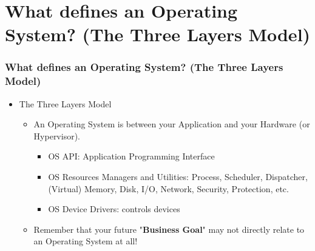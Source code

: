\documentclass[aspectratio=169, xcolor=table, notheorems, hyperref={pdfpagelabels=false}]{beamer}
\begin{document}
\section{What defines an Operating System? (The Three Layers Model)}
\begin{frame}
\frametitle{What defines an Operating System? (The Three Layers Model)}
\begin{multicols}{2}
\begin{table}
\end{table}
  \vfill \null
\columnbreak
  \begin{itemize}
    \item The Three Layers Model
  \begin{itemize}
    \item An Operating System is between your Application and your Hardware (or Hypervisor).
  \begin{itemize}
    \item OS API: Application Programming Interface
    \item OS Resources Managers and Utilities: Process, Scheduler, Dispatcher, 
             (Virtual) Memory, Disk, I/O, Network, Security, Protection, etc.
    \item OS Device Drivers: controls devices
  \end{itemize}
    \item Remember that your future "\textbf{Business Goal}" may not directly relate to an Operating System at all!
  \end{itemize}
  \end{itemize}
  \vfill \null
\end{multicols}
\end{frame}
\end{document}
